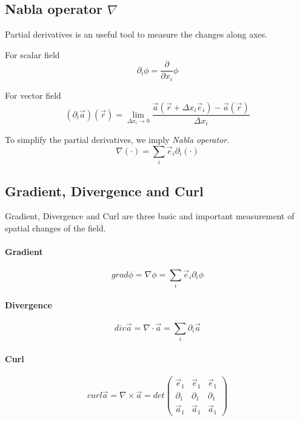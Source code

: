 \documentclass[a4paper]{article}
\begin{document}
\subsection{Nabla operator $\nabla$}
Partial derivatives is an useful tool to measure the changes along axes.

For scalar field
\begin{equation}
    \partial_{i} \phi = \frac{\partial}{\partial x_{i}} \phi
\end{equation}

For vector field
\begin{equation}
    (\partial_{i} \vec{a}) (\vec{r}) = \lim_{\Delta x_{i} \rightarrow 0} \frac{\vec{a}(\vec{r} + \Delta x_{i} \vec{e}_{i}) - \vec{a}(\vec{r})}{\Delta x_{i}}
\end{equation}

To simplify the partial derivatives, we imply \emph{Nabla operator}.
\begin{equation}
    \nabla (\cdot) = \sum_{i} \vec{e}_{i} \partial_{i} (\cdot)
\end{equation}

\subsection{Gradient, Divergence and Curl}
Gradient, Divergence and Curl are three basic and important measurement of spatial changes of the field.
\paragraph{Gradient}
\begin{equation}
    grad \phi = \nabla \phi = \sum_{i} \vec{e}_{i} \partial_{i} \phi
\end{equation}

\paragraph{Divergence}
\begin{equation}
    div \vec{a} = \nabla \cdot \vec{a} = \sum_{i} \partial_{i} \vec{a}
\end{equation}

\paragraph{Curl}
\begin{equation}
    curl \vec{a} = \nabla \times \vec{a} = det
    \begin{pmatrix}
        \vec{e}_{1}  & \vec{e}_{1}  & \vec{e}_{1}  \\
        \partial_{1} & \partial_{1} & \partial_{1} \\
        \vec{a}_{1}  & \vec{a}_{1}  & \vec{a}_{1}
    \end{pmatrix}
\end{equation}
\end{document}
